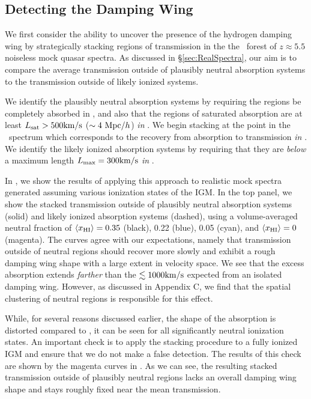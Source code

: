 \subsection{Detecting the Damping Wing} \label{sec:Damping Wing Results}



We first consider the ability to uncover the presence of the hydrogen damping wing by strategically stacking regions of transmission in the the \lya\ forest of $z \approx 5.5$ noiseless mock quasar spectra. As discussed in \S \ref{sec:RealSpectra}, our aim is to compare the average transmission outside of plausibly neutral absorption systems to the transmission outside of likely ionized systems. 


We identify the plausibly neutral absorption systems by requiring the regions be completely absorbed in \lyb, and also that the regions of saturated absorption are at least $L_{\text{sat}} > 500\text{km}/\text{s}$ ($\sim4\ \text{Mpc/$h$}$) \textit{in \lyb}. We begin stacking at the point in the \lya\ spectrum which corresponds to the recovery from absorption to transmission \textit{in \lyb}. We identify the likely ionized absorption systems by requiring that they are \textit{below} a maximum length $L_{\text{max}} = 300\text{km}/\text{s}$ \textit{in \lyb}.


In , we show the results of applying this approach to realistic mock spectra generated assuming various ionization states of the IGM. In the top panel, we show the stacked transmission outside of plausibly neutral absorption systems (solid) and likely ionized absorption systems (dashed), using a volume-averaged neutral fraction of $\langle x_{\text{HI}}\rangle = 0.35$ (black), 0.22 (blue), 0.05 (cyan), and $\langle x_{\text{HI}}\rangle = 0$ (magenta). The curves agree with our expectations, namely that transmission outside of neutral regions should recover more slowly and exhibit a rough damping wing shape with a large extent in velocity space. We see that the excess absorption extends \textit{farther} than the $\lesssim 1000\text{km}/\text{s}\ $expected from an isolated damping wing. However, as discussed in Appendix C, we find that the spatial clustering of neutral regions is responsible for this effect. 


While, for several reasons discussed earlier, the shape of the absorption is distorted compared to , it can be seen for all significantly neutral ionization states. An important check is to apply the stacking procedure to a fully ionized IGM and ensure that we do not make a false detection. The results of this check are shown by the magenta curves in . As we can see, the resulting stacked transmission outside of plausibly neutral regions lacks an overall damping wing shape and stays roughly fixed near the mean transmission. 



